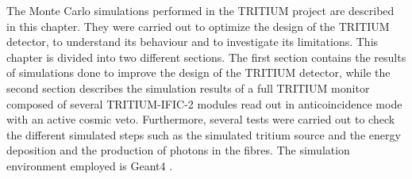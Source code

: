 The Monte Carlo simulations performed in the TRITIUM project are described in this chapter. They were carried out to optimize the design of the TRITIUM detector, to understand its behaviour and to investigate its limitations. This chapter is divided into two different sections. The first section contains the results of simulations done to improve the design of the TRITIUM detector, while the second section describes the simulation results of a full TRITIUM monitor composed of several TRITIUM-IFIC-2 modules read out in anticoincidence mode with an active cosmic veto. Furthermore, several tests were carried out to check the different simulated steps such as the simulated tritium source and the energy deposition and the production of photons in the fibres. The simulation environment employed is Geant4 \cite{Geant4WebPage, Geant4P}.